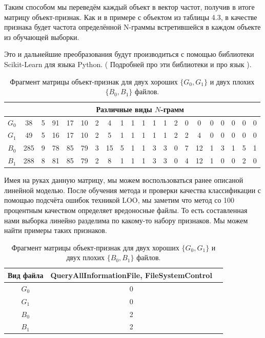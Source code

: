 Таким способом мы переведём каждый объект в вектор частот, получив в итоге матрицу объект-признак.
Как и в примере с объектом из таблицы 4.3, в качестве признака будет частота определённой N-граммы встретившейся в каждом объекте из обучающей выборки.

Это и дальнейшие преобразования будут производиться с помощью библиотеки Scikit-Learn для языка Python. ( Подробней про эти библиотеки и про язык ).

\bgroup
\def\arraystretch{1.5}%
\begin{table}[ht]
\caption{Фрагмент матрицы объект-признак для двух хороших $\{G_0, G_1\}$ и двух плохих $\{B_0, B_1\}$ файлов.}
\label{tab_weight}
\centering
    \begin{tabular}{|c|c|c|c|c|c|c|c|c|c|c|c|c|c|c|c|c|c|c|c|c|}
    \hline & \multicolumn{20}{c|}{Различные виды $N$-грамм} \\
    \hline $G_0$ & 38 & 5 & 91 & 17 & 10 & 2 & 4 & 1 & 1 & 1 & 1 & 1 & 2 & 0 & 0 & 0 & 0 & 0 & 0 & 0 \\
 	\hline $G_1$ & 49 & 5 & 16 & 17 & 10 & 2 & 5 & 1 & 1 & 1 & 1 & 1 & 2 & 2 & 4 & 0 & 0 & 0 & 0 & 0 \\
 	\hline $B_0$ & 285 & 9 & 78 & 85 & 79 & 3 & 15 & 5 & 1 & 1 & 3 & 3 & 0 & 7 & 12 & 1 & 3 & 1 & 5 & 1 \\
 	\hline $B_1$ & 288 & 8 & 81 & 85 & 79 & 2 & 8 & 1 & 1 & 1 & 3 & 3 & 0 & 4 & 12 & 1 & 0 & 0 & 2 & 0 \\
	\hline
    \end{tabular}
\end{table}
\egroup

Имея на руках данную матрицу, мы можем воспользоваться ранее описаной линейной моделью. После обучения метода и проверки качества классификации с помощью подсчёта ошибок техникой LOO, мы заметим что метод со 100 процентным качеством определяет вредоносные файлы. То есть составленная нами выборка линейно разделима по какому-то набору признаков. Мы можем найти примеры таких признаков.

\bgroup
\def\arraystretch{1.5}%
\begin{table}[ht]
\caption{Фрагмент матрицы объект-признак для двух хороших $\{G_0, G_1\}$ и двух плохих $\{B_0, B_1\}$ файлов.}
\label{tab_weight}
\centering
    \begin{tabular}{|c|c|c|}
    \hline Вид файла & QueryAllInformationFile, FileSystemControl \\
    \hline $G_0$ & 0 \\
 	\hline $G_1$ & 0 \\
 	\hline $B_0$ & 2 \\
 	\hline $B_1$ & 2 \\
	\hline
    \end{tabular}
\end{table}
\egroup

